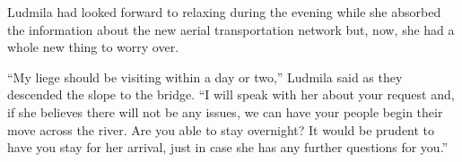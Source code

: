 

Ludmila had looked forward to relaxing during the evening while she absorbed the information about the new aerial transportation network but, now, she had a whole new thing to worry over.

 

“My liege should be visiting within a day or two,” Ludmila said as they descended the slope to the bridge. “I will speak with her about your request and, if she believes there will not be any issues, we can have your people begin their move across the river. Are you able to stay overnight? It would be prudent to have you stay for her arrival, just in case she has any further questions for you.”

 